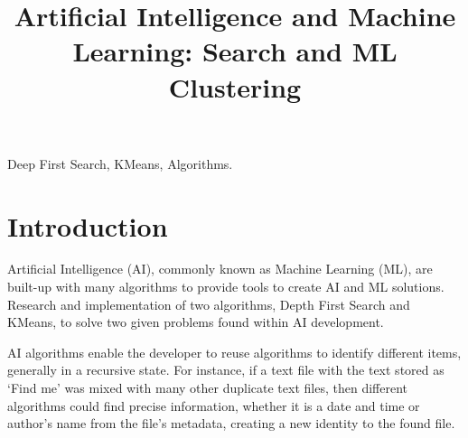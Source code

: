 \documentclass[conference]{IEEEtran}
\begin{document}
	\title{Artificial Intelligence and Machine Learning: Search and ML Clustering}

	\author{
	}

     \maketitle
    
    \thispagestyle{plain}
    \pagestyle{plain}
    
    \begin{abstract}
      
    \end{abstract}

    \begin{IEEEkeywords}
      Deep First Search, KMeans, Algorithms.
    \end{IEEEkeywords}

    \section{Introduction}
      Artificial Intelligence (AI), commonly known as Machine Learning (ML), are built-up with many algorithms to provide tools to create AI and ML solutions. Research and implementation of two algorithms, Depth First Search and KMeans, to solve two given problems found within AI development.

      AI algorithms enable the developer to reuse algorithms to identify different items, generally in a recursive state. For instance, if a text file with the text stored as `Find me' was mixed with many other duplicate text files, then different algorithms could find precise information, whether it is a date and time or author's name from the file's metadata, creating a new identity to the found file.
\end{document}
